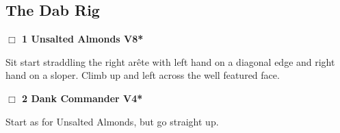 	\begin{multicols}{2}

\needspace{10em}
\subsection*{The Dab Rig}\label{bf:The Dab Rig}




\needspace{2em}
\label{rt:Unsalted Almonds}
\colorbox{Goldenrod!20}{
\parbox{0.95\linewidth}{
\hspace{-1ex}\textbf{$\Box$
1 Unsalted Almonds V8*  
}}}
\begin{adjustwidth}{1.3em}{}			

Sit start straddling the right arête with left hand on a diagonal edge and right hand on a sloper. Climb up and left across the well featured face.
\end{adjustwidth}




\needspace{2em}
\label{rt:Dank Commander}
\colorbox{RoyalBlue!20}{
\parbox{0.95\linewidth}{
\hspace{-1ex}\textbf{$\Box$
2 Dank Commander V4*  
}}}
\begin{adjustwidth}{1.3em}{}			

Start as for Unsalted Almonds, but go straight up.
\end{adjustwidth}






\end{multicols}
\clearpage